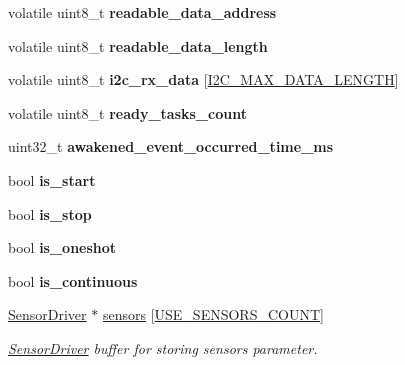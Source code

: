 \begin{DoxyCompactItemize}
volatile uint8\+\_\+t {\bfseries readable\+\_\+data\+\_\+address}
\item 
\mbox{\label{i2c-th_8h_a9f8745963db0221dc148ea1f8b2a32db}} 
volatile uint8\+\_\+t {\bfseries readable\+\_\+data\+\_\+length}
\item 
\mbox{\label{i2c-th_8h_aded715a916f3df4c1fb8cfde69ebfee8}} 
volatile uint8\+\_\+t {\bfseries i2c\+\_\+rx\+\_\+data} \mbox{[}\hyperlink{hardware__config_8h_aa552d72ce15dd8ca167c4b9323f1f25d}{I2\+C\+\_\+\+M\+A\+X\+\_\+\+D\+A\+T\+A\+\_\+\+L\+E\+N\+G\+TH}\mbox{]}
\item 
\mbox{\label{i2c-th_8h_ab51900c214aadb930a66e4581a5d205e}} 
volatile uint8\+\_\+t {\bfseries ready\+\_\+tasks\+\_\+count}
\item 
\mbox{\label{i2c-th_8h_a78178f418362740f92f9e8b16aebb380}} 
uint32\+\_\+t {\bfseries awakened\+\_\+event\+\_\+occurred\+\_\+time\+\_\+ms}
\item 
\mbox{\label{i2c-th_8h_a0437e68459618830effdd71d4d1da252}} 
bool {\bfseries is\+\_\+start}
\item 
\mbox{\label{i2c-th_8h_a75c1bec124f2bc00d40f269a6171d06f}} 
bool {\bfseries is\+\_\+stop}
\item 
\mbox{\label{i2c-th_8h_aad5fc763cd3b23392848902b82a22636}} 
bool {\bfseries is\+\_\+oneshot}
\item 
\mbox{\label{i2c-th_8h_adf47c3770ad7ac0b29836365ad1e9164}} 
bool {\bfseries is\+\_\+continuous}
\item 
\hyperlink{classSensorDriver}{Sensor\+Driver} $\ast$ \hyperlink{i2c-th_8h_a5f5c708cbddb6cef952fb9a28c8ba835}{sensors} \mbox{[}\hyperlink{rmap-config_8h_af18dc3de744722cb308451b7a705611b}{U\+S\+E\+\_\+\+S\+E\+N\+S\+O\+R\+S\+\_\+\+C\+O\+U\+NT}\mbox{]}
\begin{DoxyCompactList}\small\item\em \hyperlink{classSensorDriver}{Sensor\+Driver} buffer for storing sensors parameter. \end{DoxyCompactList}\item 
\mbox{\label{i2c-th_8h_a7727577f63dfa4aa55feb7ddd0739f83}} 

\end{DoxyCompactItemize}
